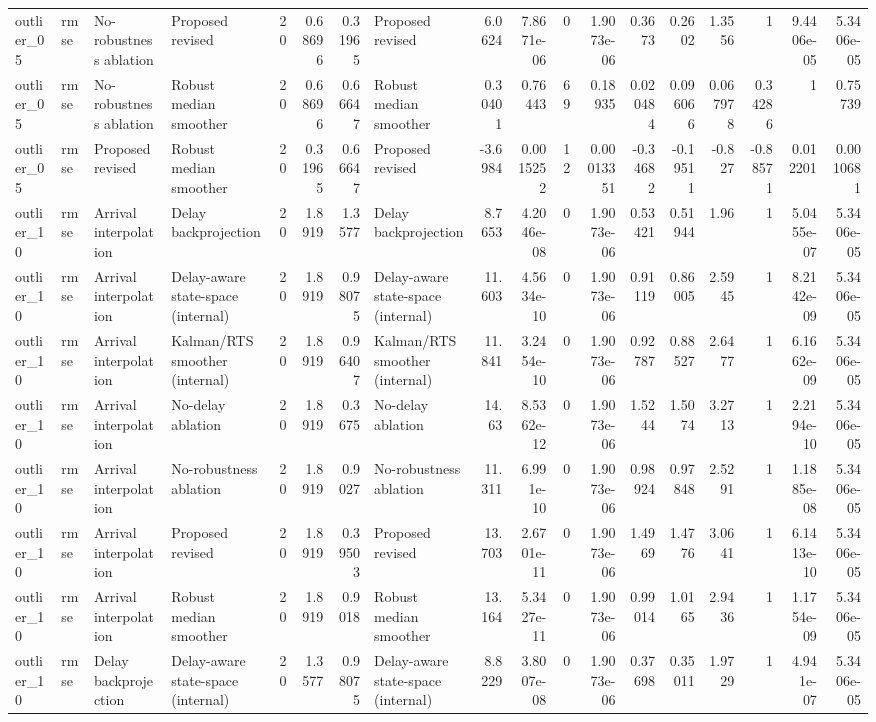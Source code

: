 \begin{table}[!htbp]
{\begin{tabular}{llllrrrlrrrrrrrrrr}
outlier_05 & rmse & No-robustness ablation & Proposed revised & 20 & 0.68696 & 0.31965 & Proposed revised & 6.0624 & 7.8671e-06 & 0 & 1.9073e-06 & 0.3673 & 0.2602 & 1.3556 & 1 & 9.4406e-05 & 5.3406e-05 \\
outlier_05 & rmse & No-robustness ablation & Robust median smoother & 20 & 0.68696 & 0.66647 & Robust median smoother & 0.30401 & 0.76443 & 69 & 0.18935 & 0.020484 & 0.096066 & 0.067978 & 0.34286 & 1 & 0.75739 \\
outlier_05 & rmse & Proposed revised & Robust median smoother & 20 & 0.31965 & 0.66647 & Proposed revised & -3.6984 & 0.0015252 & 12 & 0.00013351 & -0.34682 & -0.19511 & -0.827 & -0.88571 & 0.012201 & 0.0010681 \\
outlier_10 & rmse & Arrival interpolation & Delay backprojection & 20 & 1.8919 & 1.3577 & Delay backprojection & 8.7653 & 4.2046e-08 & 0 & 1.9073e-06 & 0.53421 & 0.51944 & 1.96 & 1 & 5.0455e-07 & 5.3406e-05 \\
outlier_10 & rmse & Arrival interpolation & Delay-aware state-space (internal) & 20 & 1.8919 & 0.98075 & Delay-aware state-space (internal) & 11.603 & 4.5634e-10 & 0 & 1.9073e-06 & 0.91119 & 0.86005 & 2.5945 & 1 & 8.2142e-09 & 5.3406e-05 \\
outlier_10 & rmse & Arrival interpolation & Kalman/RTS smoother (internal) & 20 & 1.8919 & 0.96407 & Kalman/RTS smoother (internal) & 11.841 & 3.2454e-10 & 0 & 1.9073e-06 & 0.92787 & 0.88527 & 2.6477 & 1 & 6.1662e-09 & 5.3406e-05 \\
outlier_10 & rmse & Arrival interpolation & No-delay ablation & 20 & 1.8919 & 0.3675 & No-delay ablation & 14.63 & 8.5362e-12 & 0 & 1.9073e-06 & 1.5244 & 1.5074 & 3.2713 & 1 & 2.2194e-10 & 5.3406e-05 \\
outlier_10 & rmse & Arrival interpolation & No-robustness ablation & 20 & 1.8919 & 0.9027 & No-robustness ablation & 11.311 & 6.991e-10 & 0 & 1.9073e-06 & 0.98924 & 0.97848 & 2.5291 & 1 & 1.1885e-08 & 5.3406e-05 \\
outlier_10 & rmse & Arrival interpolation & Proposed revised & 20 & 1.8919 & 0.39503 & Proposed revised & 13.703 & 2.6701e-11 & 0 & 1.9073e-06 & 1.4969 & 1.4776 & 3.0641 & 1 & 6.1413e-10 & 5.3406e-05 \\
outlier_10 & rmse & Arrival interpolation & Robust median smoother & 20 & 1.8919 & 0.9018 & Robust median smoother & 13.164 & 5.3427e-11 & 0 & 1.9073e-06 & 0.99014 & 1.0165 & 2.9436 & 1 & 1.1754e-09 & 5.3406e-05 \\
outlier_10 & rmse & Delay backprojection & Delay-aware state-space (internal) & 20 & 1.3577 & 0.98075 & Delay-aware state-space (internal) & 8.8229 & 3.8007e-08 & 0 & 1.9073e-06 & 0.37698 & 0.35011 & 1.9729 & 1 & 4.941e-07 & 5.3406e-05 \\

\end{tabular}}
\end{table}
